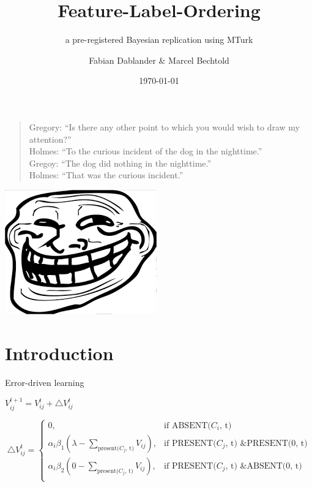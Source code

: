 \documentclass{beamer}\usepackage[]{graphicx}\usepackage[]{color}
\title{Feature-Label-Ordering}
\subtitle{a pre-registered Bayesian replication using MTurk}
\date{\today}
\author{Fabian Dablander \& Marcel Bechtold}
\institute{University of T\"{u}bingen}
\begin{document}
\begin{frame}
  \titlepage
\end{frame}

\begin{frame}
	\begin{quote}
		Gregory: ``Is there any other point to which you would wish to draw my attention?''\\
		Holmes: ``To the curious incident of the dog in the nighttime.''\\
		Gregoy: ``The dog did nothing in the nighttime.''\\
		Holmes: ``That was the curious incident.''\\
	\end{quote}
\end{frame}

\begin{frame}
	\begin{center}
		\includegraphics[scale=0.7]{figure/meme.png}
	\end{center}
\end{frame}

\section{Introduction}
\begin{frame}{Error-driven learning}
    \begin{center}
        $V^{t+1}_{ij} = V^{t}_{ij} + \bigtriangleup V^t_{ij}$
    \end{center}
    
    \begin{small}
      \begin{equation*}
          \bigtriangleup V^t_{ij} = \begin{cases}
              0, & \text{if ABSENT($C_i$, t)} \\
              \alpha_i \beta_1(\lambda - \sum\nolimits_{\text{present{($C_j$, t)}}} V_{ij}), & \text{if PRESENT($C_j$, t) \& PRESENT(0, t)}\\
              \alpha_i \beta_2(0 - \sum\nolimits_{\text{present{($C_j$, t)}}} V_{ij}), & \text{if PRESENT($C_j$, t) \& ABSENT(0, t)}\\
             \end{cases}
      \end{equation*}
    \end{small}
\end{frame}
\end{document}
